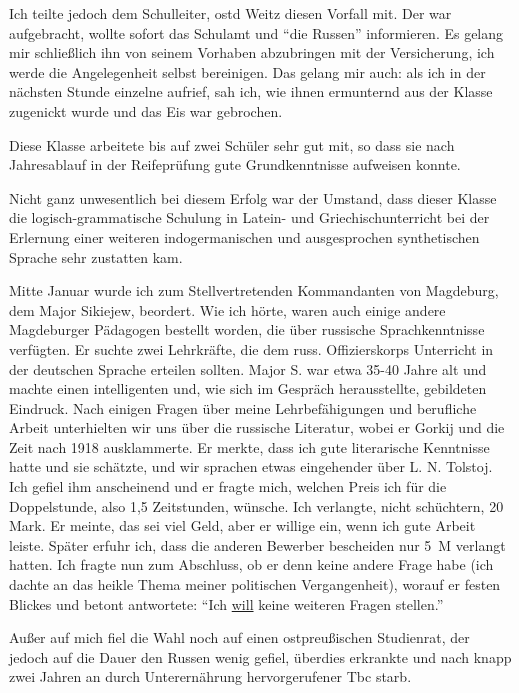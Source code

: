 \documentclass[a5paper,pagesize,10pt,twoside=true]{scrbook}
\renewcommand{\marginpar}[2][]{}
\begin{document}
Ich teilte jedoch dem Schulleiter, \ac{ostd} Weitz diesen Vorfall mit. Der war aufgebracht, wollte sofort das Schulamt und \enquote{die Russen} informieren. Es gelang mir schließlich ihn von seinem Vorhaben abzubringen mit der Versicherung, ich werde die Angelegenheit selbst bereinigen. Das gelang mir auch: als ich in der nächsten Stunde einzelne aufrief, sah ich, wie ihnen ermunternd aus der Klasse zugenickt wurde und das Eis war gebrochen.

Diese Klasse arbeitete bis auf zwei Schüler sehr gut mit, so dass sie nach Jahresablauf in der Reifeprüfung gute Grundkenntnisse aufweisen konnte.

Nicht ganz unwesentlich bei diesem Erfolg \marginpar{128} war der Umstand, dass dieser Klasse die logisch-grammatische Schulung in Latein- und Griechischunterricht bei der Erlernung einer weiteren indogermanischen und ausgesprochen synthetischen Sprache sehr zustatten kam.

Mitte Januar wurde ich zum Stellvertretenden Kommandanten von Magdeburg, dem Major Sikiejew, beordert. Wie ich hörte, waren auch einige andere Magdeburger Pädagogen bestellt worden, die über russische Sprachkenntnisse verfügten. Er suchte zwei Lehrkräfte, die dem russ. Offizierskorps Unterricht in der deutschen Sprache erteilen sollten. Major S. war etwa 35-40 Jahre alt und machte einen intelligenten und, wie sich im Gespräch herausstellte, gebildeten Eindruck. Nach einigen Fragen über meine Lehrbefähigungen und berufliche Arbeit unterhielten wir uns über die russische Literatur, wobei er Gorkij und die Zeit nach 1918 ausklammerte. Er merkte, dass ich gute literarische Kenntnisse hatte und sie schätzte, und wir sprachen etwas eingehender über L. N. Tolstoj. Ich gefiel ihm anscheinend und er fragte mich, welchen Preis ich für die Doppelstunde, also 1,5 Zeitstunden, wünsche. Ich verlangte, nicht schüchtern, 20 Mark. Er meinte, das sei viel Geld, aber er willige ein, wenn ich gute Arbeit leiste. Später erfuhr ich, dass die anderen Bewerber bescheiden nur 5~M verlangt hatten. Ich fragte nun zum Abschluss, ob er denn keine andere Frage habe (ich dachte an das heikle Thema meiner politischen \marginpar{129} Vergangenheit), worauf er festen Blickes und betont antwortete: \enquote{Ich \underline{will} keine weiteren Fragen stellen.}

Außer auf mich fiel die Wahl noch auf einen ostpreußischen Studienrat, der jedoch auf die Dauer den Russen wenig gefiel, überdies erkrankte und nach knapp zwei Jahren an durch Unterernährung hervorgerufener Tbc starb.
\end{document}
